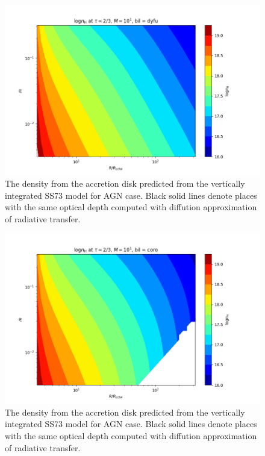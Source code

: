 \documentclass[preprint2]{aastex6}
\begin{document}
\begin{figure}
 \includegraphics[scale=0.45]{plotgen/map1d.png}
 \caption{The density from the accretion disk predicted from the vertically integrated SS73 model for AGN case.  
 Black solid lines denote places with the same optical depth computed with diffution approximation of radiative transfer.}
 \label{fig:mapa1}
\end{figure}

\begin{figure}
 \includegraphics[scale=0.45]{plotgen/map1x.png}
 \caption{The density from the accretion disk predicted from the vertically integrated SS73 model for AGN case.  
 Black solid lines denote places with the same optical depth computed with diffution approximation of radiative transfer.}
 \label{fig:mapa2}
\end{figure}
\end{document}
